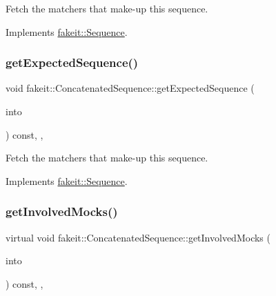 Fetch the matchers that make-\/up this sequence. 



Implements \mbox{\hyperlink{classfakeit_1_1Sequence_aa1a1e4ad2fcac3379ba38f250bf06884}{fakeit\+::\+Sequence}}.

\mbox{\label{classfakeit_1_1ConcatenatedSequence_a176b1d4dac2e552f646c2c3ce98f0d1f}} 
\subsubsection{\texorpdfstring{getExpectedSequence()}{getExpectedSequence()}\hspace{0.1cm}{\footnotesize\ttfamily [9/9]}}
{\footnotesize\ttfamily void fakeit\+::\+Concatenated\+Sequence\+::get\+Expected\+Sequence (\begin{DoxyParamCaption}\item[{std\+::vector$<$ \mbox{\hyperlink{structfakeit_1_1Invocation_1_1Matcher}{Invocation\+::\+Matcher}} $\ast$ $>$ \&}]{into }\end{DoxyParamCaption}) const\hspace{0.3cm}{\ttfamily [inline]}, {\ttfamily [override]}, {\ttfamily [virtual]}}



Fetch the matchers that make-\/up this sequence. 



Implements \mbox{\hyperlink{classfakeit_1_1Sequence_aa1a1e4ad2fcac3379ba38f250bf06884}{fakeit\+::\+Sequence}}.

\mbox{\label{classfakeit_1_1ConcatenatedSequence_a3b475e68ab4f750f2d4946e4777ebe30}} 
\subsubsection{\texorpdfstring{getInvolvedMocks()}{getInvolvedMocks()}\hspace{0.1cm}{\footnotesize\ttfamily [1/9]}}
{\footnotesize\ttfamily virtual void fakeit\+::\+Concatenated\+Sequence\+::get\+Involved\+Mocks (\begin{DoxyParamCaption}\item[{std\+::vector$<$ \mbox{\hyperlink{structfakeit_1_1ActualInvocationsSource}{Actual\+Invocations\+Source}} $\ast$ $>$ \&}]{into }\end{DoxyParamCaption}) const\hspace{0.3cm}{\ttfamily [inline]}, {\ttfamily [override]}, {\ttfamily [virtual]}}



